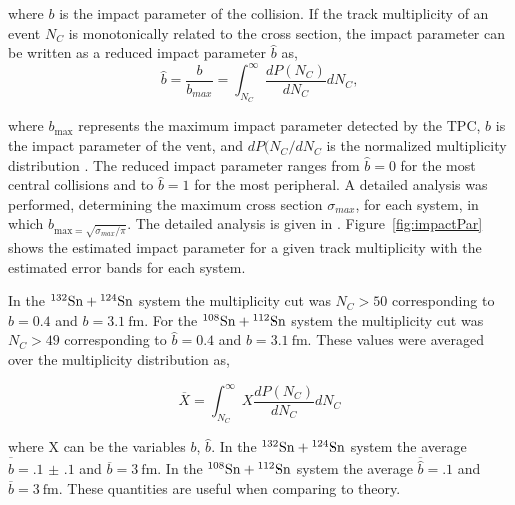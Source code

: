 where $b$ is the impact parameter of the collision.  If the track multiplicity of an event $N_C$ is monotonically related to the cross section, the impact parameter can be written as a reduced impact parameter $\hat{b}$ as,
\begin{equation}
\hat{b} =  \frac{b}{b_{max}} = \int^{\infty}_{N_C} \frac{dP(N_C)}{dN_C} dN_C,
\end{equation}

where $b_{\mathrm{max}}$ represents the maximum impact parameter detected by the TPC, $b$ is the impact parameter of the vent,  and $dP(N_C/dN_C$ is the normalized multiplicity distribution \cite{reducedimpact}. The reduced impact parameter ranges from $\hat{b}=0$ for the most central collisions and to $\hat{b}=1$ for the most peripheral. A  detailed analysis was performed, determining the maximum cross section $\sigma_{max}$, for each system, in which $b_{\mathrm{max} = \sqrt{\sigma_{max}/\pi}}$. The detailed analysis is given in \cite{jon}. Figure~\ref{fig:impactPar} shows the estimated impact parameter for a given track multiplicity with the estimated error bands for each system. 

In the ${}^{132}\mathrm{Sn} + {}^{124}\mathrm{Sn}$ system the multiplicity cut was $N_C > 50$ corresponding to $\hat{b} = 0.4$ and $b = \SI{3.1}{\femto\metre}$. For the ${}^{108}\mathrm{Sn} + {}^{112}\mathrm{Sn}$ system the multiplicity cut was $N_C > 49$ corresponding to $\hat{b} = 0.4$ and $b = \SI{3.1}{\femto\metre}$. These values were averaged over the multiplicity distribution as,

\begin{equation}
 \overline{X} = \int_{N_C}^{\infty} X\frac{dP(N_C)}{dN_C} dN_C
\end{equation}

where X can be the variables $b$, $\hat{b}$. In the ${}^{132}\mathrm{Sn} + {}^{124}\mathrm{Sn}$ system the average $\overline{\hat{b}} = \num{.1(1)}$ and $\overline{b} = \SI{3}{\femto\metre}$. In the ${}^{108}\mathrm{Sn} + {}^{112}\mathrm{Sn}$ system the average $\overline{\hat{b}} = .1$ and $\overline{b} = \SI{3}{\femto\metre}$. These quantities are useful when comparing to theory. 

